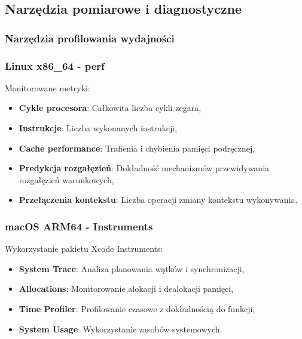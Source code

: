 \subsection{Narzędzia pomiarowe i diagnostyczne}

\subsubsection{Narzędzia profilowania wydajności}

\subsubsection{Linux x86\_64 - perf}
Monitorowane metryki:
\begin{itemize}
    \item \textbf{Cykle procesora}: Całkowita liczba cykli zegara,
    \item \textbf{Instrukcje}: Liczba wykonanych instrukcji,
    \item \textbf{Cache performance}: Trafienia i chybienia pamięci podręcznej,
    \item \textbf{Predykcja rozgałęzień}: Dokładność mechanizmów przewidywania rozgałęzień warunkowych,
    \item \textbf{Przełączenia kontekstu}: Liczba operacji zmiany kontekstu wykonywania.
\end{itemize}

\subsubsection{macOS ARM64 - Instruments}
Wykorzystanie pakietu Xcode Instruments:
\begin{itemize}
    \item \textbf{System Trace}: Analiza planowania wątków i synchronizacji,
    \item \textbf{Allocations}: Monitorowanie alokacji i dealokacji pamięci,
    \item \textbf{Time Profiler}: Profilowanie czasowe z dokładnością do funkcji,
    \item \textbf{System Usage}: Wykorzystanie zasobów systemowych.
\end{itemize}